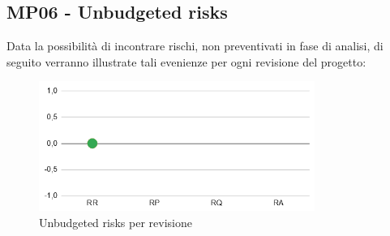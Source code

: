 \subsection{MP06 - Unbudgeted risks}
Data la possibilità di incontrare rischi, non preventivati in fase di analisi, di seguito verranno illustrate tali evenienze per ogni revisione del progetto:
\begin{figure}[H]
	\centering
	\includegraphics[width=9cm]{images/unbudgeted_risks.png}
	\caption{Unbudgeted risks per revisione}
\end{figure}
